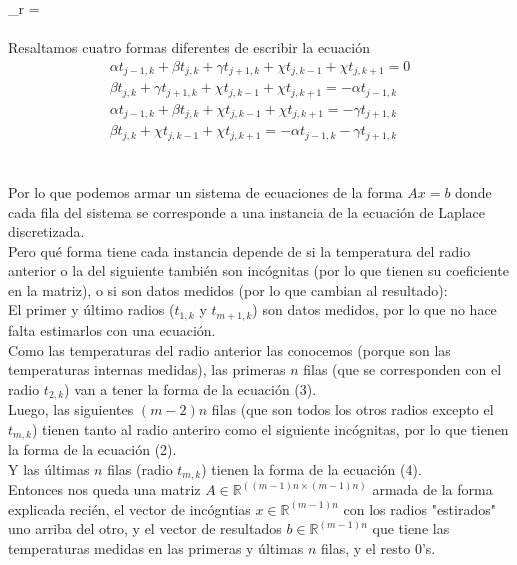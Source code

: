 \documentclass[12pt]{article}
\newcommand{\sub}[3]{\ensuremath{#1_{#2,#3}}}
\begin{document}
\tab \chi_r = 
\) \\\\
Resaltamos cuatro formas diferentes de escribir la ecuación \\
\begin{align}
  \alpha \sub{t}{j-1}{k} + \beta \sub{t}{j}{k} + \gamma \sub{t}{j+1}{k} + \chi \sub{t}{j}{k-1} + \chi \sub{t}{j}{k+1} = 0 \\
  \beta \sub{t}{j}{k} + \gamma \sub{t}{j+1}{k} + \chi \sub{t}{j}{k-1} + \chi \sub{t}{j}{k+1} = -\alpha \sub{t}{j-1}{k} \\
  \alpha \sub{t}{j-1}{k} + \beta \sub{t}{j}{k} + \chi \sub{t}{j}{k-1} + \chi \sub{t}{j}{k+1} = -\gamma \sub{t}{j+1}{k} \\
  \beta \sub{t}{j}{k} + \chi \sub{t}{j}{k-1} + \chi \sub{t}{j}{k+1} = -\alpha \sub{t}{j-1}{k} - \gamma \sub{t}{j+1}{k}
\end{align}
\\
\paragraph{} Por lo que podemos armar un sistema de ecuaciones de la forma \(Ax = b\) donde cada fila del sistema se corresponde a una instancia de la ecuación de Laplace discretizada. \\
Pero qué forma tiene cada instancia depende de si la temperatura del radio anterior o la del siguiente también son incógnitas (por lo que tienen su coeficiente en la matriz), o si son datos medidos (por lo que cambian al resultado): \\
\tab El primer y último radios (\(\sub{t}{1}{k}\) y \(\sub{t}{m+1}{k}\)) son datos medidos, por lo que no hace falta estimarlos con una ecuación. \\
\tab Como las temperaturas del radio anterior las conocemos (porque son las temperaturas internas medidas), las primeras \(n\) filas (que se corresponden con el radio \(\sub{t}{2}{k}\)) van a tener la forma de la ecuación (3). \\ %
\tab Luego, las siguientes \((m-2)n\) filas (que son todos los otros radios excepto el \(\sub{t}{m}{k}\)) tienen tanto al radio anteriro como el siguiente incógnitas, por lo que tienen la forma de la ecuación (2). \\ %
\tab Y las últimas \(n\) filas (radio \(\sub{t}{m}{k}\)) tienen la forma de la ecuación (4). \\ %
Entonces nos queda una matriz \(A \in \mathbb{R}^{((m-1)n \times (m-1)n)}\) armada de la forma explicada recién, el vector de incógntias \(x \in \mathbb{R}^{(m-1)n}\) con los radios "estirados" uno arriba del otro, y el vector de resultados \(b \in \mathbb{R}^{(m-1)n}\) que tiene las temperaturas medidas en las primeras y últimas \(n\) filas, y el resto 0's.
\end{document}
